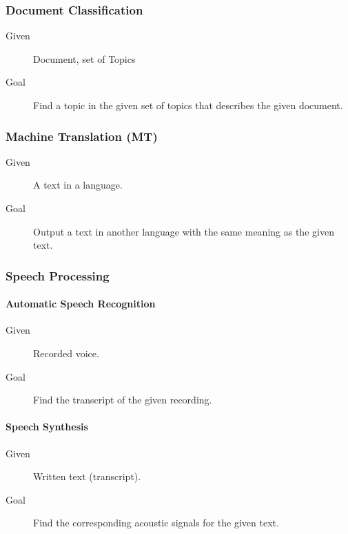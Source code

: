             \subsubsection{Document Classification} %
                \begin{description}
                	\item[Given] Document, set of Topics
                	\item[Goal] Find a topic in the given set of topics that describes the given document.
                \end{description}
            
            \subsubsection{Machine Translation (MT)} %
	            \begin{description}
	            	\item[Given] A text in a language.
	            	\item[Goal] Output a text in another language with the same meaning as the given text.
	            \end{description}
            
            \subsubsection{Speech Processing} %
            	\paragraph{Automatic Speech Recognition}
            		\begin{description}
            			\item[Given] Recorded voice.
            			\item[Goal] Find the transcript of the given recording.
            		\end{description}
            	
            	\paragraph{Speech Synthesis}
            		\begin{description}
            			\item[Given] Written text (transcript).
            			\item[Goal] Find the corresponding acoustic signals for the given text.
            		\end{description}
            
